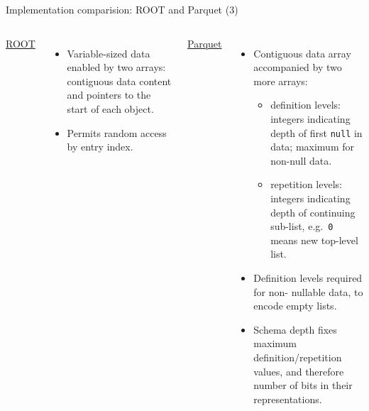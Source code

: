 \documentclass[aspectratio=169]{beamer}
\begin{document}
\begin{frame}{Implementation comparision: ROOT and Parquet (3)}
\vspace{0.5 cm}
\begin{columns}
{\large \underline{ROOT}}

\begin{itemize}
\item Variable-sized data enabled by two arrays: contiguous data content and pointers to the start of each object.

\item Permits random access by entry index.
\end{itemize}

{\large \underline{Parquet}}

\begin{itemize}
\item Contiguous data array accompanied by two more arrays:
\begin{itemize}
\item definition levels: integers indicating depth of first {\tt\small null} in data; maximum for non-null data.
\item repetition levels: integers indicating depth of continuing sub-list, e.g.\ {\tt\small 0} means new top-level list.
\end{itemize}

\item Definition levels required for non- nullable data, to encode empty lists.

\item Schema depth fixes maximum definition/repetition values, and therefore number of bits in their representations.
\end{itemize}
\end{columns}
\end{frame}
\end{document}
